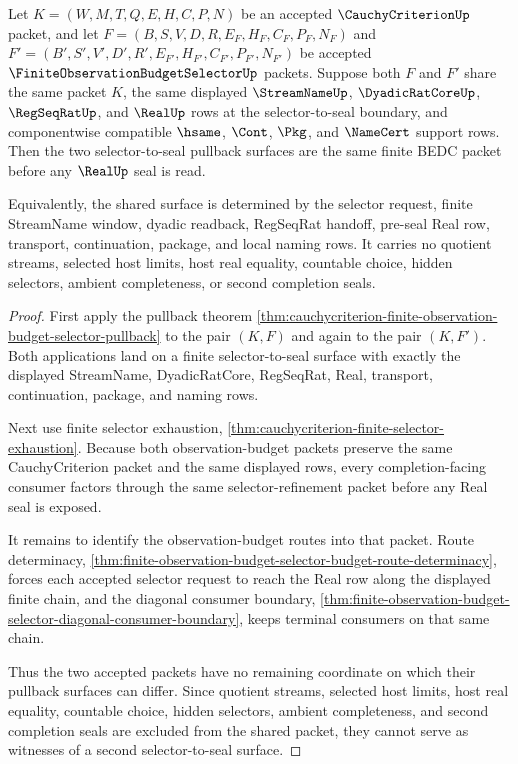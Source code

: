 \begin{theorem}
\label{thm:cauchycriterion-finite-observation-budget-selector-uniqueness}
Let $K=(W,M,T,Q,E,H,C,P,N)$ be an accepted $\CauchyCriterionUp$ packet, and
let $F=(B,S,V,D,R,E_F,H_F,C_F,P_F,N_F)$ and
$F'=(B',S',V',D',R',E_{F'},H_{F'},C_{F'},P_{F'},N_{F'})$ be accepted
$\FiniteObservationBudgetSelectorUp$ packets. Suppose both $F$ and $F'$ share
the same packet $K$, the same displayed $\StreamNameUp$, $\DyadicRatCoreUp$,
$\RegSeqRatUp$, and $\RealUp$ rows at the selector-to-seal boundary, and
componentwise compatible $\hsame$, $\Cont$, $\Pkg$, and $\NameCert$ support
rows. Then the two selector-to-seal pullback surfaces are the same finite BEDC
packet before any $\RealUp$ seal is read.

Equivalently, the shared surface is determined by the selector request, finite
StreamName window, dyadic readback, RegSeqRat handoff, pre-seal Real row,
transport, continuation, package, and local naming rows. It carries no
quotient streams, selected host limits, host real equality, countable choice,
hidden selectors, ambient completeness, or second completion seals.
\end{theorem}
\begin{proof}
First apply the pullback theorem
\autoref{thm:cauchycriterion-finite-observation-budget-selector-pullback} to
the pair $(K,F)$ and again to the pair $(K,F')$. Both applications land on a
finite selector-to-seal surface with exactly the displayed StreamName,
DyadicRatCore, RegSeqRat, Real, transport, continuation, package, and naming
rows.

Next use finite selector exhaustion,
\autoref{thm:cauchycriterion-finite-selector-exhaustion}. Because both
observation-budget packets preserve the same CauchyCriterion packet and the
same displayed rows, every completion-facing consumer factors through the
same selector-refinement packet before any Real seal is exposed.

It remains to identify the observation-budget routes into that packet. Route
determinacy,
\autoref{thm:finite-observation-budget-selector-budget-route-determinacy},
forces each accepted selector request to reach the Real row along the displayed
finite chain, and the diagonal consumer boundary,
\autoref{thm:finite-observation-budget-selector-diagonal-consumer-boundary},
keeps terminal consumers on that same chain.

Thus the two accepted packets have no remaining coordinate on which their
pullback surfaces can differ. Since quotient streams, selected host limits,
host real equality, countable choice, hidden selectors, ambient completeness,
and second completion seals are excluded from the shared packet, they cannot
serve as witnesses of a second selector-to-seal surface.
\end{proof}

